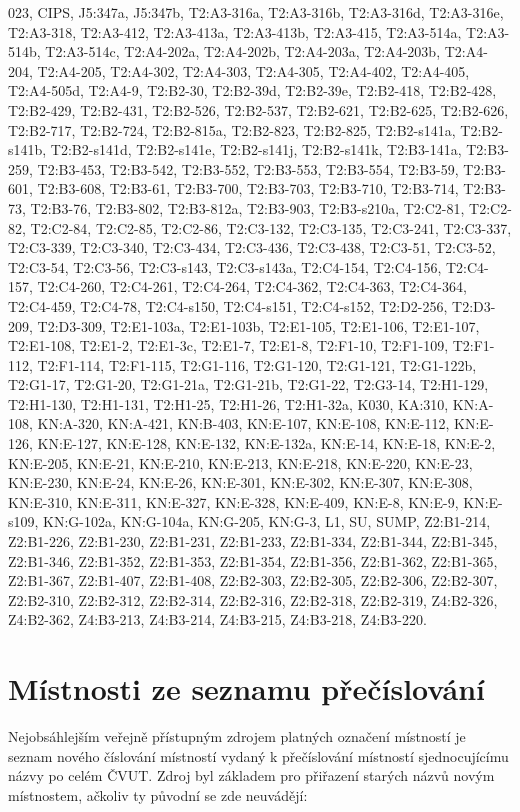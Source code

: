 {\footnotesize 023, CIPS, J5:347a, J5:347b, T2:A3-316a, T2:A3-316b, T2:A3-316d, T2:A3-316e, T2:A3-318, T2:A3-412, T2:A3-413a, T2:A3-413b, T2:A3-415, T2:A3-514a, T2:A3-514b, T2:A3-514c, T2:A4-202a, T2:A4-202b, T2:A4-203a, T2:A4-203b, T2:A4-204, T2:A4-205, T2:A4-302, T2:A4-303, T2:A4-305, T2:A4-402, T2:A4-405, T2:A4-505d, T2:A4-9, T2:B2-30, T2:B2-39d, T2:B2-39e, T2:B2-418, T2:B2-428, T2:B2-429, T2:B2-431, T2:B2-526, T2:B2-537, T2:B2-621, T2:B2-625, T2:B2-626, T2:B2-717, T2:B2-724, T2:B2-815a, T2:B2-823, T2:B2-825, T2:B2-s141a, T2:B2-s141b, T2:B2-s141d, T2:B2-s141e, T2:B2-s141j, T2:B2-s141k, T2:B3-141a, T2:B3-259, T2:B3-453, T2:B3-542, T2:B3-552, T2:B3-553, T2:B3-554, T2:B3-59, T2:B3-601, T2:B3-608, T2:B3-61, T2:B3-700, T2:B3-703, T2:B3-710, T2:B3-714, T2:B3-73, T2:B3-76, T2:B3-802, T2:B3-812a, T2:B3-903, T2:B3-s210a, T2:C2-81, T2:C2-82, T2:C2-84, T2:C2-85, T2:C2-86, T2:C3-132, T2:C3-135, T2:C3-241, T2:C3-337, T2:C3-339, T2:C3-340, T2:C3-434, T2:C3-436, T2:C3-438, T2:C3-51, T2:C3-52, T2:C3-54, T2:C3-56, T2:C3-s143, T2:C3-s143a, T2:C4-154, T2:C4-156, T2:C4-157, T2:C4-260, T2:C4-261, T2:C4-264, T2:C4-362, T2:C4-363, T2:C4-364, T2:C4-459, T2:C4-78, T2:C4-s150, T2:C4-s151, T2:C4-s152, T2:D2-256, T2:D3-209, T2:D3-309, T2:E1-103a, T2:E1-103b, T2:E1-105, T2:E1-106, T2:E1-107, T2:E1-108, T2:E1-2, T2:E1-3c, T2:E1-7, T2:E1-8, T2:F1-10, T2:F1-109, T2:F1-112, T2:F1-114, T2:F1-115, T2:G1-116, T2:G1-120, T2:G1-121, T2:G1-122b, T2:G1-17, T2:G1-20, T2:G1-21a, T2:G1-21b, T2:G1-22, T2:G3-14, T2:H1-129, T2:H1-130, T2:H1-131, T2:H1-25, T2:H1-26, T2:H1-32a, K030, KA:310, KN:A-108, KN:A-320, KN:A-421, KN:B-403, KN:E-107, KN:E-108, KN:E-112, KN:E-126, KN:E-127, KN:E-128, KN:E-132, KN:E-132a, KN:E-14, KN:E-18, KN:E-2, KN:E-205, KN:E-21, KN:E-210, KN:E-213, KN:E-218, KN:E-220, KN:E-23, KN:E-230, KN:E-24, KN:E-26, KN:E-301, KN:E-302, KN:E-307, KN:E-308, KN:E-310, KN:E-311, KN:E-327, KN:E-328, KN:E-409, KN:E-8, KN:E-9, KN:E-s109, KN:G-102a, KN:G-104a, KN:G-205, KN:G-3, L1, SU, SUMP, Z2:B1-214, Z2:B1-226, Z2:B1-230, Z2:B1-231, Z2:B1-233, Z2:B1-334, Z2:B1-344, Z2:B1-345, Z2:B1-346, Z2:B1-352, Z2:B1-353, Z2:B1-354, Z2:B1-356, Z2:B1-362, Z2:B1-365, Z2:B1-367, Z2:B1-407, Z2:B1-408, Z2:B2-303, Z2:B2-305, Z2:B2-306, Z2:B2-307, Z2:B2-310, Z2:B2-312, Z2:B2-314, Z2:B2-316, Z2:B2-318, Z2:B2-319, Z4:B2-326, Z4:B2-362, Z4:B3-213, Z4:B3-214, Z4:B3-215, Z4:B3-218, Z4:B3-220.}

\section{Místnosti ze seznamu přečíslování}
Nejobsáhlejším veřejně přístupným zdrojem platných označení místností je seznam nového číslování místností \cite{FelPrecislovani} vydaný k přečíslování místností sjednocujícímu názvy po celém ČVUT. Zdroj byl základem pro přiřazení starých názvů novým místnostem, ačkoliv ty původní se zde neuvádějí:

